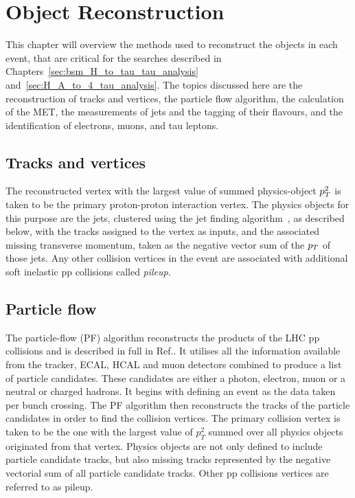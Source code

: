 \chapter{Object Reconstruction}
\label{sec:object_reconstruction}

This chapter will overview the methods used to reconstruct the objects in each event, that are critical for the searches described in Chapters~\ref{sec:bsm_H_to_tau_tau_analysis} and~\ref{sec:H_A_to_4_tau_analysis}.
The topics discussed here are the reconstruction of tracks and vertices, the particle flow algorithm, the calculation of the \ac{MET}, the measurements of jets and the tagging of their flavours, and the identification of electrons, muons, and tau leptons.

\section{Tracks and vertices}

The reconstructed vertex with the largest value of summed physics-object $p_{T}^{2}$ is taken to be the primary proton-proton interaction vertex. 
The physics objects for this purpose are the jets, clustered using the jet finding algorithm~\cite{Cacciari:2008gp,Cacciari:2011ma}, as described below, with the tracks assigned to the vertex as inputs, and the
associated missing transverse momentum, taken as the negative vector sum of the $p_{T}$ of those jets.
Any other collision vertices in the event are associated with additional soft inelastic pp collisions called \emph{pileup}.



\section{Particle flow}

The particle-flow (PF) algorithm reconstructs the products of the LHC pp collisions and is described in full in Ref.\cite{PF_CMS}.  
It utilises all the information available from the tracker, ECAL, HCAL and muon detectors combined to produce a list of particle candidates. 
These candidates are either a photon, electron, muon or a neutral or charged hadrons. It begins with defining an event as the data taken per bunch crossing. 
The PF algorithm then reconstructs the tracks of the particle candidates in order to find the collision vertices. 
The primary collision vertex is taken to be the one with the largest value of \(p_T^{2}\) summed over all physics objects originated from that vertex. 
Physics objects are not only defined to include particle candidate tracks, but also missing tracks represented by the negative vectorial sum of all particle candidate tracks. Other pp collisions vertices are referred to as pileup. \\

